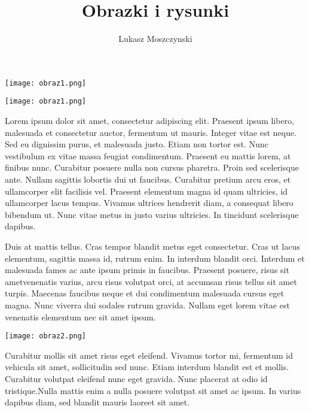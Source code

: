 \documentclass[a4paper,12pt]{amsart}
\author[L. Moszczynski]{Lukasz Moszczynski}
\title[Obrazki]{Obrazki i rysunki}
\begin{document}
\maketitle
\begin{center}
\texttt{[image: obraz1.png]}
\end{center}
\begin{center}
\texttt{[image: obraz1.png]}
\end{center}

Lorem ipsum dolor sit amet, consectetur adipiscing elit. Praesent ipsum libero, malesuada et consectetur auctor, fermentum ut mauris. Integer vitae est neque. Sed eu dignissim purus, et malesuada justo. Etiam non tortor est. Nunc vestibulum ex vitae massa feugiat condimentum. Praesent eu mattis lorem, at finibus nunc. Curabitur posuere nulla non cursus pharetra. Proin sed scelerisque ante. Nullam sagittis lobortis dui ut faucibus. Curabitur pretium arcu eros, et ullamcorper elit facilisis vel. Praesent elementum magna id quam ultricies, id ullamcorper lacus tempus. Vivamus ultrices hendrerit diam, a consequat libero bibendum ut. Nunc vitae metus in justo varius ultricies. In tincidunt scelerisque dapibus.

Duis at mattis tellus. Cras tempor blandit metus eget consectetur. Cras ut lacus elementum, sagittis massa id, rutrum enim. In interdum blandit orci. Interdum et malesuada fames ac ante ipsum primis in faucibus. Praesent posuere, risus sit ametvenenatis varius, arcu risus volutpat orci, at accumsan risus tellus sit amet turpis. Maecenas faucibus neque et dui condimentum malesuada cursus eget magna. Nunc viverra dui sodales rutrum gravida. Nullam eget lorem vitae est venenatis elementum nec sit amet ipsum.
\begin{center}
    \texttt{[image: obraz2.png]}
\end{center}
 Curabitur mollis sit amet risus eget eleifend. Vivamus tortor mi, fermentum id vehicula sit amet, sollicitudin sed nunc. Etiam interdum blandit est et mollis. Curabitur volutpat eleifend nunc eget gravida. Nunc placerat at odio id tristique.Nulla mattis enim a nulla posuere volutpat sit amet ac ipsum. In varius dapibus diam, sed blandit mauris laoreet sit amet.
\end{document}
